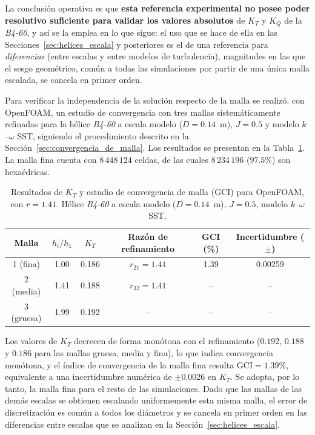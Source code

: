La conclusión operativa es que \textbf{esta referencia experimental no posee poder resolutivo suficiente para validar los valores absolutos} de $K_T$ y $K_Q$ de la \textit{B4-60}, y así se la emplea en lo que sigue: el uso que se hace de ella en las Secciones~\ref{sec:helices_escala} y posteriores es el de una referencia para \emph{diferencias} (entre escalas y entre modelos de turbulencia), magnitudes en las que el sesgo geométrico, común a todas las simulaciones por partir de una única malla escalada, se cancela en primer orden.


Para verificar la independencia de la solución respecto de la malla se realizó, con OpenFOAM, un estudio de convergencia con tres mallas sistemáticamente refinadas para la hélice \textit{B4-60} a escala modelo ($D=0.14$~m), $J=0.5$ y modelo $k$--$\omega$ SST, siguiendo el procedimiento descrito en la Sección~\ref{sec:convergencia_de_malla}. Los resultados se presentan en la Tabla~\ref{tab:gci_kt}. La malla fina cuenta con $8\,448\,124$ celdas, de las cuales $8\,234\,196$ ($97.5\%$) son hexaédricas.

\begin{table}[htbp]
\centering
\caption{Resultados de $K_T$ y estudio de convergencia de malla (GCI) para OpenFOAM, con $r = 1.41$. Hélice \textit{B4-60}
a escala modelo ($D=0.14$~m), $J=0.5$, modelo $k$--$\omega$ SST.}
\label{tab:gci_kt}
\begin{tabular}{cccccc}
\hline
Malla & $h_i/h_1$ & $K_T$ & Razón de refinamiento & GCI (\%) & Incertidumbre ($\pm$) \\
\hline
1 (fina)   & 1.00 & 0.186 & $r_{21} = 1.41$ & 1.39 & 0.00259 \\
2 (media)  & 1.41 & 0.188 & $r_{32} = 1.41$ & --   & --      \\
3 (gruesa) & 1.99 & 0.192 & --              & --   & --      \\
\hline
\end{tabular}
\end{table}

Los valores de $K_T$ decrecen de forma monótona con el refinamiento ($0.192$,
$0.188$ y $0.186$ para las mallas gruesa, media y fina), lo que indica
convergencia monótona, y el índice de convergencia de la malla fina resulta
$\mathrm{GCI} = 1.39\%$, equivalente a una incertidumbre numérica de
$\pm 0.0026$ en $K_T$. Se adopta, por lo tanto, la malla fina para el resto
de las simulaciones. Dado que las mallas de las demás escalas se obtienen
escalando uniformemente esta misma malla, el error de discretización es común
a todos los diámetros y se cancela en primer orden en las diferencias entre
escalas que se analizan en la Sección~\ref{sec:helices_escala}.

